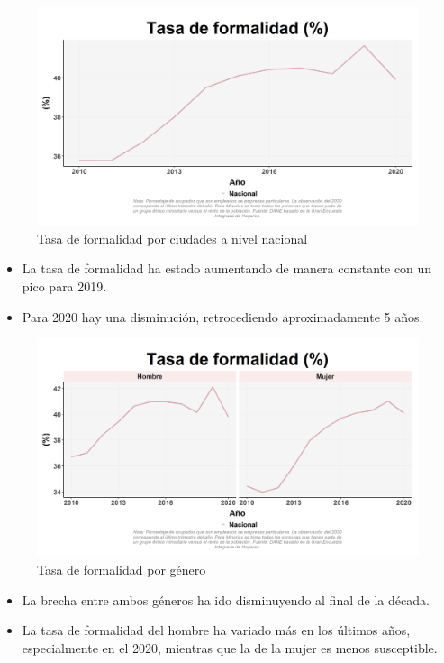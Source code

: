     \begin{figure}[H]
        \caption{Tasa de formalidad por ciudades a nivel nacional \label{map_result_2} }
        \begin{center}
        \includegraphics[width=\textwidth,keepaspectratio]{img/var_60_trend.png}
        \end{center}
    \end{figure}
            \begin{itemize}
                \item La tasa de formalidad ha estado aumentando de manera constante con un pico para 2019.
                \item Para 2020 hay una disminución, retrocediendo aproximadamente 5 años.
                \end{itemize}

    \begin{figure}[H]
        \caption{Tasa de formalidad por género \label{map_result_2} }
        \begin{center}
        \includegraphics[width=\textwidth,keepaspectratio]{img/var_59_trend.png}
        \end{center}
    \end{figure}
            \begin{itemize}
                \item La brecha entre ambos géneros ha ido disminuyendo al final de la década.
                \item La tasa de formalidad del hombre ha variado más en los últimos años, especialmente en el 2020, mientras que la de la mujer es menos susceptible.
                \end{itemize}

